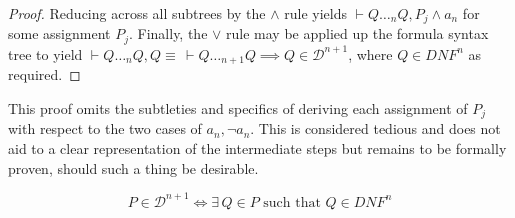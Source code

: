 \begin{proof}
        Reducing across all subtrees by the $\wedge$ rule yields $\vdash Q \ldots_n Q, P_j \wedge a_n$ for some assignment $P_j$.
        Finally, the $\vee$ rule may be applied up the formula syntax tree to yield $\vdash Q \ldots_{n} Q, Q \equiv \, \vdash Q \ldots_{n+1} Q \implies Q \in \mathcal{D}^{n+1}$, where $Q \in \textit{DNF}^n$ as required.
    \end{proof}

    \begin{remark} \label{remark:proof-subtleties}
        This proof omits the subtleties and specifics of deriving each assignment of $P_j$ with respect to the two cases of $a_n, \neg a_n$.
        This is considered tedious and does not aid to a clear representation of the intermediate steps but remains to be formally proven, should such a thing be desirable.
    \end{remark}

    \begin{proposition*}
        
        \begin{equation*}
            P \in \mathcal{D}^{n+1} \iff \exists \, Q \in P \text{ such that } Q \in DNF^{n}
        \end{equation*}
    \end{proposition*}

    
    \begin{remarks}
        \citet{tableaux-for-logic-of-proofs}
        \citet{connection-based-proof-method}
    \end{remarks}
